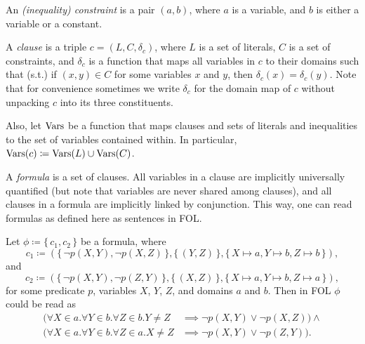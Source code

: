 \begin{definition}
  An \emph{(inequality) constraint} is a pair $(a, b)$, where $a$ is a variable,
  and $b$ is either a variable or a constant.
\end{definition}

\begin{definition}
  A \emph{clause} is a triple $c = (L, C, \delta_c)$, where $L$ is a set of
  literals, $C$ is a set of constraints, and $\delta_c$ is a function that maps
  all variables in $c$ to their domains such that (s.t.) if $(x, y) \in C$ for
  some variables $x$ and $y$, then $\delta_c(x) = \delta_c(y)$. Note that for
  convenience sometimes we write $\delta_c$ for the domain map of $c$ without
  unpacking $c$ into its three constituents.

  Also, let $\operatorname{Vars}$ be a function that maps clauses and sets of literals and
  inequalities to the set of variables contained within. In particular,
  $\operatorname{Vars}(c) \coloneqq \operatorname{Vars}(L) \cup \operatorname{Vars}(C)$.
\end{definition}

A \emph{formula} is a set of clauses. All variables in a clause are implicitly
universally quantified (but note that variables are never shared among clauses),
and all clauses in a formula are implicitly linked by conjunction. This way, one
can read formulas as defined here as sentences in FOL.

\begin{example} \label{example:first} Let $\phi \coloneqq \{\, c_1, c_2 \,\}$ be
  a formula, where
  \[
    c_1 \coloneqq (\{\, \neg p(X, Y), \neg p(X, Z) \,\}, \{\, (Y, Z) \,\}, \{\, X \mapsto a, Y \mapsto b, Z \mapsto b \,\}),
  \]
  and
  \[
    c_2 \coloneqq (\{\, \neg p(X, Y), \neg p(Z, Y) \,\}, \{\, (X, Z) \,\}, \{\, X \mapsto a, Y \mapsto b, Z \mapsto a \,\}),
  \]
  for some predicate $p$, variables $X$, $Y$, $Z$, and domains $a$ and $b$. Then
  in FOL $\phi$ could be read as
  \begin{align*}
    (\forall X \in a. \forall Y \in b. \forall Z \in b. Y \ne Z &\implies \neg p(X, Y) \lor \neg p(X, Z)) \land \\
    (\forall X \in a. \forall Y \in b. \forall Z \in a. X \ne Z &\implies \neg p(X, Y) \lor \neg p(Z, Y)).
  \end{align*}
\end{example}

